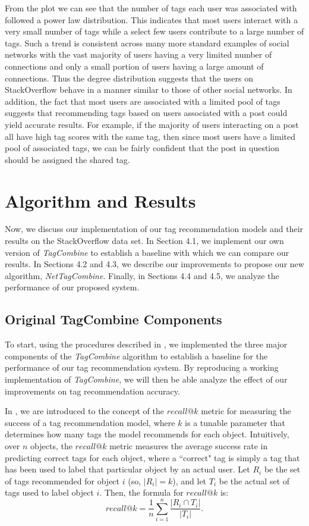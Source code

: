\documentclass[10pt]{IEEEtran}
\begin{document}
From the plot we can see that the number of tags each user was associated with followed a power law distribution. This indicates that most users interact with a very small number of tags while a select few users contribute to a large number of tags. Such a trend is consistent across many more standard examples of social networks with the vast majority of users having a very limited number of connections and only a small portion of users having a large amount of connections. Thus the degree distribution suggests that the users on StackOverflow behave in a manner similar to those of other social networks. In addition, the fact that most users are associated with a limited pool of tags suggests that recommending tags based on users associated with a post could yield accurate results. For example, if the majority of users interacting on a post all have high tag scores with the same tag, then since most users have a limited pool of associated tags, we can be fairly confident that the post in question should be assigned the shared tag.

\section{Algorithm and Results}

Now, we discuss our implementation of our tag recommendation models and their results on the StackOverflow data set. In Section 4.1, we implement our own version of \textit{TagCombine} to establish a baseline with which we can compare our results. In Sections 4.2 and 4.3, we describe our improvements to propose our new algorithm, \textit{NetTagCombine}. Finally, in Sections 4.4 and 4.5, we analyze the performance of our proposed system.

\subsection{Original TagCombine Components}

To start, using the procedures described in \cite{1}, we implemented the three major components of the \textit{TagCombine} algorithm to establish a baseline for the performance of our tag recommendation system. By reproducing a working implementation of \textit{TagCombine}, we will then be able analyze the effect of our improvements on tag recommendation accuracy.

In \cite{1}, we are introduced to the concept of the $recall@k$ metric for measuring the success of a tag recommendation model, where $k$ is a tunable parameter that determines how many tags the model recommends for each object. Intuitively, over $n$ objects, the $recall@k$ metric measures the average success rate in predicting correct tags for each object, where a ``correct" tag is simply a tag that has been used to label that particular object by an actual user. Let $R_i$ be the set of tags recommended for object $i$ (so, $|R_i| = k$), and let $T_i$ be the actual set of tags used to label object $i$. Then, the formula for $recall@k$ is:
\[recall@k = \frac{1}{n}\sum\limits_{i=1}^{n}\frac{|R_i \cap T_i|}{|T_i|}.\]
\end{document}
